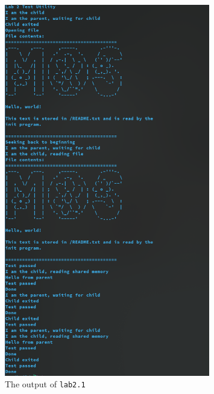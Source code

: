\begin{figure}
    \centering
    \includegraphics[width=0.8\textwidth]{assets/c2.lab2.png}
    \caption{The output of \texttt{lab2.1}}
    \label{fig:lab2.1-fork}
\end{figure}
